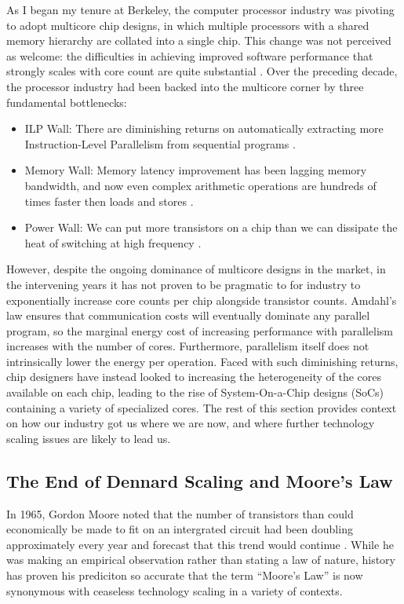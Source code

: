 As I began my tenure at Berkeley, the computer processor industry was pivoting to adopt multicore chip designs,
in which multiple processors with a shared memory hierarchy are collated into a single chip.
This change was not perceived as welcome: the difficulties in achieving improved software performance that strongly scales with core count are quite substantial \cite{Asanovic:EECS-2006-183}.
Over the preceding decade, the processor industry had been backed into the multicore corner by three fundamental bottlenecks:
\begin{itemize}
\item ILP Wall: There are diminishing returns on automatically extracting more Instruction-Level Parallelism from sequential programs \cite{hennessy2011computer}.
\item Memory Wall: Memory latency improvement has been lagging memory bandwidth, and now even complex arithmetic operations are hundreds of times faster then loads and stores \cite{wulf1995hitting}.
\item Power Wall: We can put more transistors on a chip than we can dissipate the heat of switching at high frequency \cite{shacham-micro10}.
\end{itemize}

However, despite the ongoing dominance of multicore designs in the market, in the intervening years it has not proven to be pragmatic to for industry to exponentially increase core counts per chip alongside transistor counts.
Amdahl's law ensures that communication costs will eventually dominate any parallel program, so the marginal energy cost of increasing performance with parallelism increases with the number of cores.
Furthermore, parallelism itself does not intrinsically lower the energy per operation.
Faced with such diminishing returns, chip designers have instead looked to increasing the heterogeneity of the cores available on each chip, leading to the rise of System-On-a-Chip designs (SoCs) containing a variety of specialized cores.
The rest of this section provides context on how our industry got us where we are now, and where further technology scaling issues are likely to lead us.

\subsection{The End of Dennard Scaling and Moore's Law}

In 1965, Gordon Moore noted that the number of transistors than could economically be made to fit on an intergrated circuit had been doubling approximately every year and forecast that this trend would continue \cite{moore2006cramming}.
While he was making an empirical observation rather than stating a law of nature, history has proven his prediciton so accurate that the term ``Moore's Law'' is now synonymous with ceaseless technology scaling in a variety of contexts.

